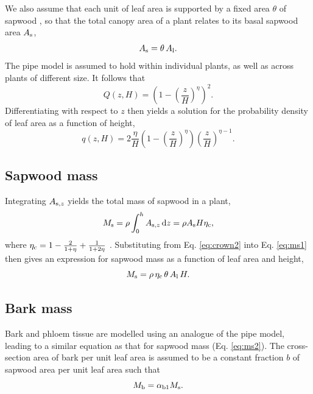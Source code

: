 \documentclass[10pt,twoside]{article}
\begin{document}
We also assume that each unit of leaf area is supported by a fixed area \(\theta\) of
sapwood \citep[in agreement with the pipe model;][]{Shinozaki-1964}, so that the total canopy
area of a plant relates to its basal sapwood area \(A_{\rm s}\),
\begin{equation}\label{eq:crown2}
A_{\rm s} = \theta \, A_{\rm l}.
\end{equation}
The pipe model is assumed to hold within individual plants, as well as
across plants of different size. It follows that
\begin{equation}\label{eq:crown1}
Q(z, H) = \left(1-\left(\frac{z}{H}\right)^\eta\right)^2.
\end{equation}
Differentiating with respect to \(z\) then yields a solution for the
probability density of leaf area as a function of height,
\begin{equation}\label{eq:crown3}
q(z, H) = 2\frac{\eta}{H}\left(1-\left(\frac{z}{H}\right)^{\eta}\right) \left(\frac{z}{H}\right)^{\eta-1}.
\end{equation}

\subsection{Sapwood mass}\label{mass-of-sapwood}

Integrating \(A_{{\rm s},z}\) yields the total mass of
sapwood in a plant,
\begin{equation}\label{eq:ms1}
M_{\rm s}  = \rho \int_0^h A_{{\rm s},z} \, {\rm d}z = \rho A_{\rm s} H \eta_{\rm c} ,
\end{equation}
where \(\eta_{\rm c} = 1 - \frac{2}{1 + \eta} + \frac{1}{1 + 2\eta}\)
\citep{Yokozawa-1995}. Substituting from Eq. \ref{eq:crown2}  into Eq.
\ref{eq:ms1} then gives an expression for sapwood mass as a function of
leaf area and height,
\begin{equation}\label{eq:ms2}
M_{\rm s} = \rho \, \eta_{\rm c} \, \theta \, A_{\rm l}  \, H.
\end{equation}

\subsection{Bark mass}\label{bark-mass}

Bark and phloem tissue are modelled using an analogue of the pipe model,
leading to a similar equation as that for sapwood mass (Eq.
\ref{eq:ms2}). The cross-section area of bark per unit leaf area is
assumed to be a constant fraction \(b\) of sapwood area per unit leaf
area such that
\begin{equation}\label{eq:mb}
M_{\rm b} = \alpha_{{\rm b1}} M_{\rm s}.
\end{equation}
\end{document}
